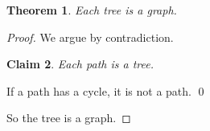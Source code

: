 \documentclass{article}
\newtheorem{theorem}{Theorem}
\newtheorem{claim}[theorem]{Claim}
\begin{document}
\begin{theorem} Each tree is a graph. \end{theorem}
\begin{proof}
We argue by contradiction.

\begin{claim}\label{c1} Each path is a tree. \end{claim}

\proof    If a path has a cycle, it is not a path. \qed

So the tree is a graph.
\end{proof}
\end{document}
